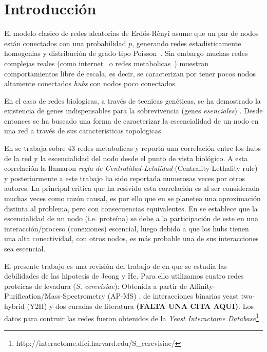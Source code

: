\section{Introducci\'on}
El modelo clasico de redes aleatorias de Erd\"os-R\`enyi asume que un par de 
nodos est\'an conectados con una probabilidad $p$, generando redes estadisticamente
homogenias y distribuci\'on de grado tipo Poisson~\citep{jeong2000}. Sin embargo 
muchas redes complejas reales (como internet~\citep{faloutsos1999} o 
redes metabolicas~\citep{jeong2000}) muestran comportamientos libre de 
escala, es decir, se caracterizan por tener pocos nodos altamente conectados 
\textit{hubs} con nodos poco conectados.

En el caso de redes biologicas, a trav\'es de tecnicas gen\'eticas, se ha 
demostrado la existencia de genes indispensables para la sobrevivencia (genes
\textit{esenciales}) \citep{kamath2003,winzeler1999}. Desde entonces se ha 
buscado una forma de caracterizar la escencialidad de un nodo en una red a 
trav\'es de sus caracteristicas topologicas.

En \citet{jeong2000} se trabaja sobre 43 redes metabolicas y reporta una 
correlaci\'on entre los hubs de la red y la escencialidad del nodo desde 
el punto de vista biol\'ogico. A esta correlaci\'on la llamaron 
\textit{regla de Centralidad-Letalidad} (Centrality-Lethality rule) y 
posteriormente a este trabajo ha sido reportada numerosas veces por otros 
autores. La principal critica que ha resivido esta correlaci\'on es al ser
considerada muchas veces como raz\'on causal, es por ello que en
\citet{he2006} se planetea una aproximaci\'on distinta al problema, pero 
con consecuencias equivalentes. En \citep{he2006} se establece que la
escencialidad de un nodo (i.e. prote\'ina) se debe a la participaci\'on de 
este en una interacci\'on/proceso (conexiones) escencial, luego debido 
a que los hubs tienen una alta conectividad, con otros nodos, es m\'as 
probable una de sus interacciones sea escencial.


El presente trabajo es una revisi\'on del trabajo de \citet{zotenko2008} en que 
se estudia las debilidades de las hipotesis de Jeong y He. Para ello utilizamos
cuatro redes proteicas de levadura (\textit{S. cerevisiae}): Obtenida a partir 
de Affinity-Purification/Mass-Spectrometry (AP-MS) \citep{apms_data}, de 
interacciones binarias yeast two-hybrid (Y2H) \citep{y2h_data} y dos curadas 
de literatura \citep{lit_data} {\bf (FALTA UNA CITA AQUI)}. Los datos para 
contruir las redes fueron obtenidos de la \textit{Yeast Interactome Database}\footnote{http://interactome.dfci.harvard.edu/S\_cerevisiae/}
